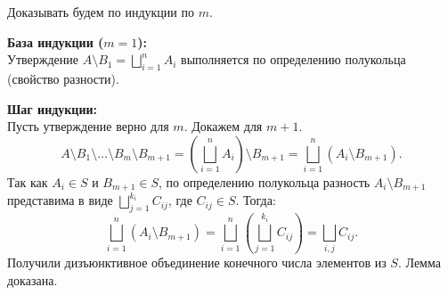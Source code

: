 \begin{Proof}
    Доказывать будем по индукции по $m$. %
    
    \textbf{База индукции ($m=1$):} \\
    Утверждение $A \setminus B_1 = \bigsqcup_{i=1}^{n} A_i$ выполняется по определению полукольца (свойство разности). %

    \textbf{Шаг индукции:} \\
    Пусть утверждение верно для $m$. Докажем для $m+1$. %
    \[
        A \setminus B_1 \setminus \dots \setminus B_m \setminus B_{m+1} = \left( \bigsqcup_{i=1}^{n} A_i \right) \setminus B_{m+1} = \bigsqcup_{i=1}^{n} (A_i \setminus B_{m+1}).
    \]
    Так как $A_i \in S$ и $B_{m+1} \in S$, по определению полукольца разность $A_i \setminus B_{m+1}$ представима в виде $\bigsqcup_{j=1}^{k_i} C_{ij}$, где $C_{ij} \in S$. %
    Тогда:
    \[
        \bigsqcup_{i=1}^{n} (A_i \setminus B_{m+1}) = \bigsqcup_{i=1}^{n} \left( \bigsqcup_{j=1}^{k_i} C_{ij} \right) = \bigsqcup_{i, j} C_{ij}.
    \]
    Получили дизъюнктивное объединение конечного числа элементов из $S$. Лемма доказана. %
\end{Proof}


